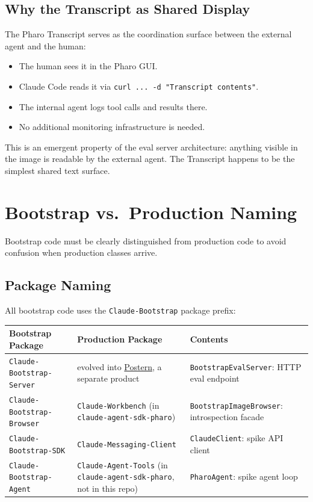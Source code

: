 \documentclass[a4paper,10pt,fleqn]{article}
\newcommand{\cls}[1]{\texttt{#1}}
\newcommand{\pkg}[1]{\texttt{#1}}
\begin{document}
\subsection{Why the Transcript as Shared Display}

The Pharo Transcript serves as the coordination surface between the
external agent and the human:

\begin{itemize}
  \item The human sees it in the Pharo GUI.
  \item Claude Code reads it via
    \texttt{curl ... -d "Transcript contents"}.
  \item The internal agent logs tool calls and results there.
  \item No additional monitoring infrastructure is needed.
\end{itemize}

This is an emergent property of the eval server architecture: anything
visible in the image is readable by the external agent.  The Transcript
happens to be the simplest shared text surface.

\section{Bootstrap vs.\ Production Naming}

Bootstrap code must be clearly distinguished from production code to
avoid confusion when production classes arrive.

\subsection{Package Naming}

All bootstrap code uses the \pkg{Claude-Bootstrap} package prefix:

\begin{center}
\begin{tabularx}{\linewidth}{@{}llY@{}}
\toprule
\textbf{Bootstrap Package} & \textbf{Production Package} & \textbf{Contents} \\
\midrule
\pkg{Claude-Bootstrap-Server}  & evolved into
  \href{https://github.com/punt-labs/postern}{Postern}, a separate
  product &
  \cls{BootstrapEvalServer}: HTTP eval endpoint \\
\pkg{Claude-Bootstrap-Browser} & \pkg{Claude-Workbench} (in
  \texttt{claude-agent-sdk-pharo}) &
  \cls{BootstrapImageBrowser}: introspection facade \\
\pkg{Claude-Bootstrap-SDK}     & \pkg{Claude-Messaging-Client} &
  \cls{ClaudeClient}: spike API client \\
\pkg{Claude-Bootstrap-Agent}   & \pkg{Claude-Agent-Tools} (in
  \texttt{claude-agent-sdk-pharo}, not in this repo) &
  \cls{PharoAgent}: spike agent loop \\
\bottomrule
\end{tabularx}
\end{center}
\end{document}
